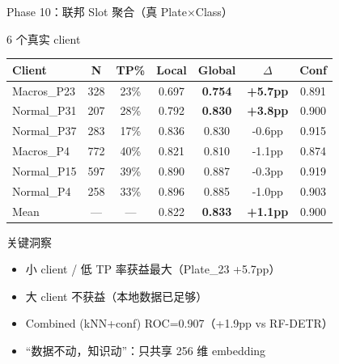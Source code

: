 \documentclass[aspectratio=169, 10pt]{beamer}
\begin{document}
\begin{frame}{Phase 10：联邦 Slot 聚合（真 Plate$\times$Class）}
  \begin{block}{6 个真实 client}
    \begin{tabular}{lcccccc}
      \toprule
      \textbf{Client} & \textbf{N} & \textbf{TP\%} & \textbf{Local} & \textbf{Global} & \textbf{$\Delta$} & \textbf{Conf} \\
      \midrule
      Macros\_P23 & 328 & 23\% & 0.697 & \textbf{0.754} & \textbf{+5.7pp} & 0.891 \\
      Normal\_P31 & 207 & 28\% & 0.792 & \textbf{0.830} & \textbf{+3.8pp} & 0.900 \\
      Normal\_P37 & 283 & 17\% & 0.836 & 0.830 & -0.6pp & 0.915 \\
      Macros\_P4 & 772 & 40\% & 0.821 & 0.810 & -1.1pp & 0.874 \\
      Normal\_P15 & 597 & 39\% & 0.890 & 0.887 & -0.3pp & 0.919 \\
      Normal\_P4 & 258 & 33\% & 0.896 & 0.885 & -1.0pp & 0.903 \\
      \midrule
      Mean & --- & --- & 0.822 & \textbf{0.833} & \textbf{+1.1pp} & 0.900 \\
      \bottomrule
    \end{tabular}
  \end{block}
  \vspace{0em}
  \begin{alertblock}{关键洞察}
    \begin{itemize}
      \item 小 client / 低 TP 率获益最大（Plate\_23 +5.7pp）
      \item 大 client 不获益（本地数据已足够）
      \item Combined (kNN+conf) ROC=0.907（+1.9pp vs RF-DETR）
      \item ``数据不动，知识动''：只共享 256 维 embedding
    \end{itemize}
  \end{alertblock}
\end{frame}
\end{document}

